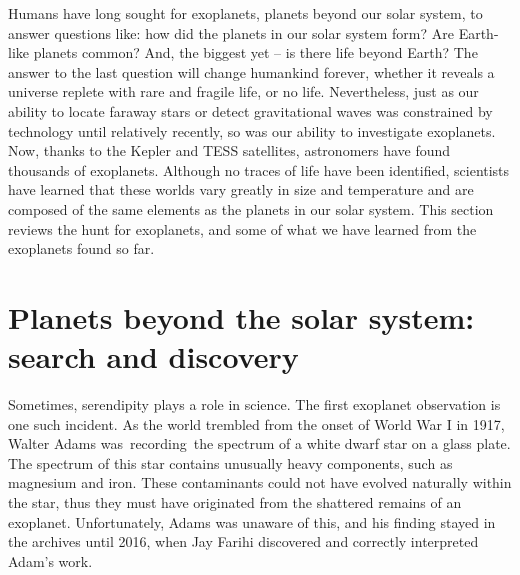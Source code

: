 Humans have long sought for exoplanets, planets beyond our solar system, to answer questions like: how did the planets in our solar system form? Are Earth-like planets common? And, the biggest yet -- is there life beyond Earth? 
The answer to the last question will change humankind forever, whether it reveals a universe replete with rare and fragile life, or no life.
Nevertheless, just as our ability to locate faraway stars or detect gravitational waves was constrained by technology until relatively recently, so was our ability to investigate exoplanets.
Now, thanks to the Kepler and TESS satellites, astronomers have found thousands of exoplanets.
Although no traces of life have been identified, scientists have learned that these worlds vary greatly in size and temperature and are composed of the same elements as the planets in our solar system.
This section reviews the hunt for exoplanets, and some of what we have learned from the exoplanets found so far.

\section{Planets beyond the solar system: search and discovery}

Sometimes, serendipity plays a role in science.
The first  exoplanet observation is one such incident.
As the world trembled from the onset of World War I in 1917, Walter Adams was recording the spectrum of a white dwarf star on a glass plate.
The spectrum of this star contains unusually heavy components, such as magnesium and iron.
These contaminants could not have evolved naturally within the star, thus they must have originated from the shattered remains of an exoplanet.
Unfortunately, Adams was unaware of this, and his finding stayed in the archives until 2016, when Jay Farihi discovered and correctly interpreted Adam's work.

